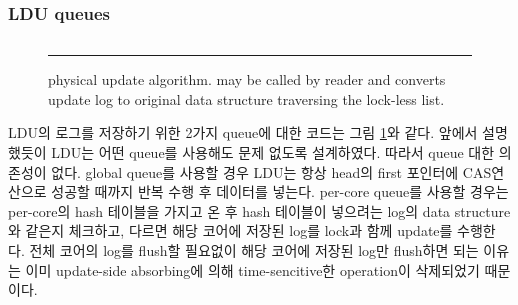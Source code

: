 \fi

\ifkorthesis
\subsubsection{LDU queues}
\begin{figure}[tb]
\inputminted[linenos,fontsize=\footnotesize, tabsize=2]{c}{src/ldu_queue.c}
\rule{\columnwidth}{0.5pt}
\vspace{-\baselineskip}
\caption{ physical update algorithm.  may be
 called by reader and converts update log to original data structure
 traversing the lock-less list.}
\label{fig:lduqueue}
\end{figure}

LDU의 로그를 저장하기 위한 2가지 queue에 대한 코드는 그림 \ref{fig:lduqueue}와 같다. 
앞에서 설명했듯이 LDU는 어떤 queue를 사용해도 문제 없도록 설계하였다.
따라서 queue 대한 의존성이 없다.
global queue를 사용할 경우 LDU는 항상 head의 first 포인터에 CAS연산으로 성공할 때까지 반복 수행 후 데이터를 넣는다. 
per-core queue를 사용할 경우는 per-core의 hash 테이블을 가지고 온 후 hash 테이블이 넣으려는 log의
data structure와 같은지 체크하고, 다르면 해당 코어에 저장된 log를 lock과 함께 update를 수행한다.
전체 코어의 log를 flush할 필요없이 해당 코어에 저장된 log만 flush하면 되는 이유는 이미 update-side
absorbing에 의해 time-sencitive한 operation이 삭제되었기 때문이다.
\fi






